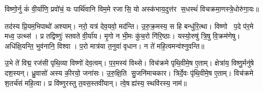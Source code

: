 


विष्णो॒र्नु कं॑ वी॒र्या॑णि॒ प्रवो॑चं॒ यः पार्थि॑वानि विम॒मे रजासि॒ यो अस्क॑भाय॒दुत्त॑र स॒धस्थं॑ विचक्रमा॒णस्त्रे॒धोरु॑गा॒यः॥ 

तद॑स्य प्रि॒यम॒भिपाथो॑ अश्याम्। नरो॒ यत्र॑ देव॒यवो॒ मद॑न्ति। उ॒रु॒क्र॒मस्य॒ स हि बन्धु॑रि॒त्था। विष्णो प॒दे प॑र॒मे मध्व॒ उत्थ्स॑। प्र तद्विष्णुः॑  स्तवते वी॒र्या॑य। मृ॒गो न भी॒मः कु॑च॒रो गि॑रि॒ष्ठाः। यस्यो॒रुषु॑ त्रि॒षु वि॒क्रम॑णेषु। अधि॑क्षि॒यन्ति॒ भुव॑नानि॒ विश्वा। प॒रो मात्र॑या त॒नुवा॑ वृधान। न ते॑ महि॒त्वमन्व॑श्नुवन्ति॥ 

उ॒भे ते॑ विद्म॒ रज॑सी पृथि॒व्या विष्णो॑ देव॒त्वम्। प॒र॒मस्य॑ विथ्से। विच॑क्रमे पृथि॒वीमे॒ष ए॒ताम्। क्षेत्रा॑य॒ विष्णु॒र्मनु॑षे दश॒स्यन्। ध्रु॒वासो॑ अस्य की॒रयो॒ जना॑सः। उ॒रु॒क्षि॒ति सु॒जनि॑माचकार। त्रिर्दे॒वः पृ॑थि॒वीमे॒ष ए॒ताम्। विच॑क्रमे श॒तर्च॑सं महि॒त्वा। प्र वि॑ष्णुरस्तु त॒वस॒स्तवी॑यान्। त्वे॒षह्य॑स्य॒ स्थवि॑रस्य॒ नाम॑॥ 

